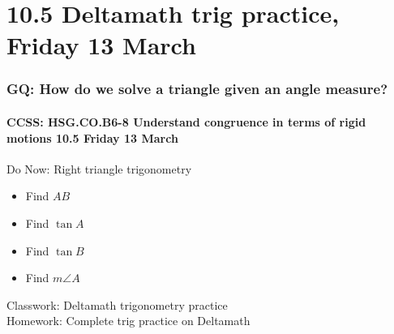 \documentclass{beamer}
\begin{document}
\section{10.5 Deltamath trig practice, Friday 13 March} 
\frame
{
  \frametitle{GQ: How do we solve a triangle given an angle measure?}
  \framesubtitle{CCSS: HSG.CO.B6-8 Understand congruence in terms of rigid motions \hfill \alert{10.5 Friday 13 March}}

  \begin{block}{Do Now: Right triangle trigonometry}
    \begin{multicols}{2}
    \begin{itemize}
      \item Find $AB$
      \item Find $\tan A$
      \item Find $\tan B$
      \item Find $m\angle A$
    \end{itemize}
  \end{multicols}
    \end{block}
    Classwork: Deltamath trigonometry practice \\
    Homework: Complete trig practice on Deltamath
}
\end{document}
